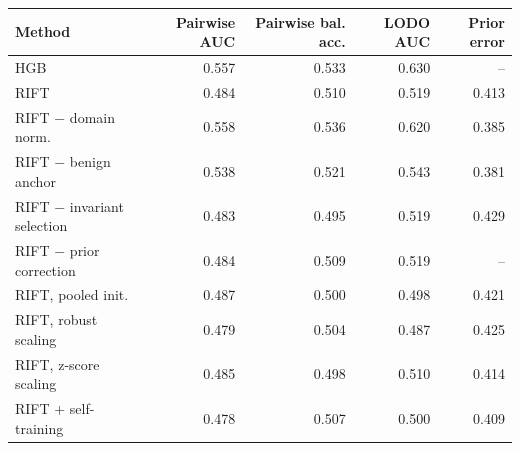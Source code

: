 \begin{tabular}{lrrrr}
\toprule
Method & Pairwise AUC & Pairwise bal. acc. & LODO AUC & Prior error \\
\midrule
HGB & 0.557 & 0.533 & 0.630 & -- \\
RIFT & 0.484 & 0.510 & 0.519 & 0.413 \\
RIFT $-$ domain norm. & 0.558 & 0.536 & 0.620 & 0.385 \\
RIFT $-$ benign anchor & 0.538 & 0.521 & 0.543 & 0.381 \\
RIFT $-$ invariant selection & 0.483 & 0.495 & 0.519 & 0.429 \\
RIFT $-$ prior correction & 0.484 & 0.509 & 0.519 & -- \\
RIFT, pooled init. & 0.487 & 0.500 & 0.498 & 0.421 \\
RIFT, robust scaling & 0.479 & 0.504 & 0.487 & 0.425 \\
RIFT, z-score scaling & 0.485 & 0.498 & 0.510 & 0.414 \\
RIFT + self-training & 0.478 & 0.507 & 0.500 & 0.409 \\
\bottomrule
\end{tabular}
